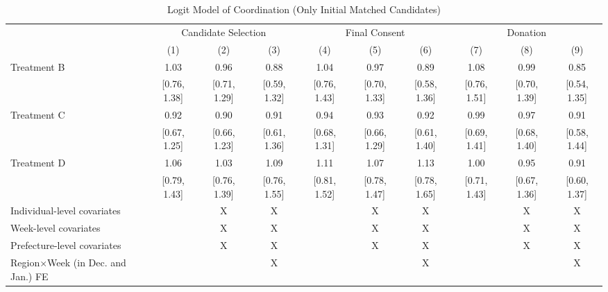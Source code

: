 \documentclass[12pt, a4paper]{article}
\begin{document}
\begin{landscape}\begin{table}[H]

\caption{\label{tab:logit-coordinate-initial-matched}Logit Model of Coordination (Only Initial Matched Candidates)}
\centering
\fontsize{8}{10}\selectfont
\begin{threeparttable}
\begin{tabular}[t]{lccccccccc}
\toprule
\multicolumn{1}{c}{ } & \multicolumn{3}{c}{Candidate Selection} & \multicolumn{3}{c}{Final Consent} & \multicolumn{3}{c}{Donation} \\
\cmidrule(l{3pt}r{3pt}){2-4} \cmidrule(l{3pt}r{3pt}){5-7} \cmidrule(l{3pt}r{3pt}){8-10}
  & (1) & (2) & (3) & (4) & (5) & (6) & (7) & (8) & (9)\\
\midrule
Treatment B & \num{1.03} & \num{0.96} & \num{0.88} & \num{1.04} & \num{0.97} & \num{0.89} & \num{1.08} & \num{0.99} & \num{0.85}\\
 & {}[\num{0.76}, \num{1.38}] & {}[\num{0.71}, \num{1.29}] & {}[\num{0.59}, \num{1.32}] & {}[\num{0.76}, \num{1.43}] & {}[\num{0.70}, \num{1.33}] & {}[\num{0.58}, \num{1.36}] & {}[\num{0.76}, \num{1.51}] & {}[\num{0.70}, \num{1.39}] & {}[\num{0.54}, \num{1.35}]\\
Treatment C & \num{0.92} & \num{0.90} & \num{0.91} & \num{0.94} & \num{0.93} & \num{0.92} & \num{0.99} & \num{0.97} & \num{0.91}\\
 & {}[\num{0.67}, \num{1.25}] & {}[\num{0.66}, \num{1.23}] & {}[\num{0.61}, \num{1.36}] & {}[\num{0.68}, \num{1.31}] & {}[\num{0.66}, \num{1.29}] & {}[\num{0.61}, \num{1.40}] & {}[\num{0.69}, \num{1.41}] & {}[\num{0.68}, \num{1.40}] & {}[\num{0.58}, \num{1.44}]\\
Treatment D & \num{1.06} & \num{1.03} & \num{1.09} & \num{1.11} & \num{1.07} & \num{1.13} & \num{1.00} & \num{0.95} & \num{0.91}\\
 & {}[\num{0.79}, \num{1.43}] & {}[\num{0.76}, \num{1.39}] & {}[\num{0.76}, \num{1.55}] & {}[\num{0.81}, \num{1.52}] & {}[\num{0.78}, \num{1.47}] & {}[\num{0.78}, \num{1.65}] & {}[\num{0.71}, \num{1.43}] & {}[\num{0.67}, \num{1.36}] & {}[\num{0.60}, \num{1.37}]\\
\midrule
Individual-level covariates &  & X & X &  & X & X &  & X & X\\
Week-level covariates &  & X & X &  & X & X &  & X & X\\
Prefecture-level covariates &  & X & X &  & X & X &  & X & X\\
Region$\times$Week (in Dec. and Jan.) FE &  &  & X &  &  & X &  &  & X\\

\end{tabular}
\end{threeparttable}
\end{table}
\end{landscape}
\end{document}
